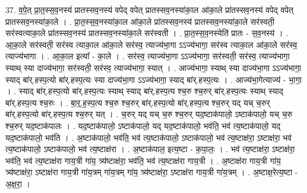 \documentclass[17pt]{extarticle}
\begin{document}
37. व॒पे॒त् प्रा॒त॒स्स॒व॒नस्य॑ प्रातस्सव॒नस्य॑ वपेद् वपेत् प्रातस्सव॒नस्या॑का॒ल आ॑का॒ले प्रा॑तस्सव॒नस्य॑ वपेद् वपेत् प्रातस्सव॒नस्या॑का॒ले । . प्रा॒त॒स्स॒व॒नस्या॑का॒ल आ॑का॒ले प्रा॑तस्सव॒नस्य॑ प्रातस्सव॒नस्या॑का॒ले सर॑स्वती॒ सर॑स्वत्याका॒ले प्रा॑तस्सव॒नस्य॑ प्रातस्सव॒नस्या॑का॒ले सर॑स्वती । . प्रा॒त॒स्स॒व॒नस्येति॑ प्रातः - स॒व॒नस्य॑ । . आ॒का॒ले सर॑स्वती॒ सर॑स्व त्याका॒ल आ॑का॒ले सर॑स्व॒ त्याज्य॑भा॒गा ऽऽज्य॑भागा॒ सर॑स्व त्याका॒ल आ॑का॒ले सर॑स्व॒ त्याज्य॑भागा । . आ॒का॒ल इत्या᳚ - का॒ले । . सर॑स्व॒ त्याज्य॑भा॒गा ऽऽज्य॑भागा॒ सर॑स्वती॒ सर॑स्व॒ त्याज्य॑भागा॒ स्याथ् स्या दाज्य॑भागा॒ सर॑स्वती॒ सर॑स्व॒ त्याज्य॑भागा॒ स्यात् । . आज्य॑भागा॒ स्याथ् स्या दाज्य॑भा॒गा ऽऽज्य॑भागा॒ स्याद् बा॑र्.हस्प॒त्यो बा॑र्.हस्प॒त्यः स्या दाज्य॑भा॒गा ऽऽज्य॑भागा॒ स्याद् बा॑र्.हस्प॒त्यः । . आज्य॑भा॒गेत्याज्य॑ - भा॒गा॒ । . स्याद् बा॑र्.हस्प॒त्यो बा॑र्.हस्प॒त्यः स्याथ् स्याद् बा॑र्.हस्प॒त्य श्च॒रु श्च॒रुर् बा॑र्.हस्प॒त्यः स्याथ् स्याद् बा॑र्.हस्प॒त्य श्च॒रुः । . बा॒र्॒.ह॒स्प॒त्य श्च॒रु श्च॒रुर् बा॑र्.हस्प॒त्यो बा॑र्.हस्प॒त्य श्च॒रुर् यद् यच् च॒रुर् बा॑र्.हस्प॒त्यो बा॑र्.हस्प॒त्य श्च॒रुर् यत् । . च॒रुर् यद् यच् च॒रु श्च॒रुर् यद॒ष्टाक॑पालो॒ ऽष्टाक॑पालो॒ यच् च॒रु श्च॒रुर् यद॒ष्टाक॑पालः । . यद॒ष्टाक॑पालो॒ ऽष्टाक॑पालो॒ यद् यद॒ष्टाक॑पालो॒ भव॑ति॒ भव॑ त्य॒ष्टाक॑पालो॒ यद् यद॒ष्टाक॑पालो॒ भव॑ति । . अ॒ष्टाक॑पालो॒ भव॑ति॒ भव॑ त्य॒ष्टाक॑पालो॒ ऽष्टाक॑पालो॒ भव॑ त्य॒ष्टाक्ष॑रा॒ ऽष्टाक्ष॑रा॒ भव॑ त्य॒ष्टाक॑पालो॒ ऽष्टाक॑पालो॒ भव॑ त्य॒ष्टाक्ष॑रा । . अ॒ष्टाक॑पाल॒ इत्य॒ष्टा - क॒पा॒लः॒ । . भव॑ त्य॒ष्टाक्ष॑रा॒ ऽष्टाक्ष॑रा॒ भव॑ति॒ भव॑ त्य॒ष्टाक्ष॑रा गाय॒त्री गा॑य॒ त्र्य॑ष्टाक्ष॑रा॒ भव॑ति॒ भव॑ त्य॒ष्टाक्ष॑रा गाय॒त्री । . अ॒ष्टाक्ष॑रा गाय॒त्री गा॑य॒ त्र्य॑ष्टाक्ष॑रा॒ ऽष्टाक्ष॑रा गाय॒त्री गा॑य॒त्रम् गा॑य॒त्रम् गा॑य॒ त्र्य॑ष्टाक्ष॑रा॒ ऽष्टाक्ष॑रा गाय॒त्री गा॑य॒त्रम् । . अ॒ष्टाक्ष॒रेत्य॒ष्टा - अ॒क्ष॒रा॒ । \newline
\end{document}
